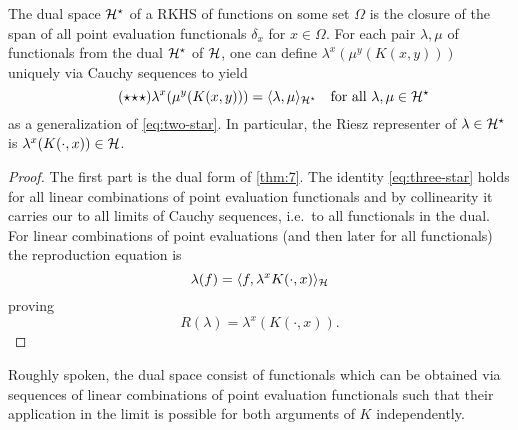 \documentclass[../lecture-notes.tex]{subfiles}
\begin{document}
\begin{theorem} %
\label{thm:10}
The dual space $\mathcal{H}^{\star}$ of a \ac{RKHS} of functions on some set $\Omega$ is the closure of the span of all point evaluation functionals $\delta_x$ for $x \in \Omega$.
For each pair $\lambda, \mu$ of functionals from the dual $\mathcal{H}^{\star}$ of $\mathcal{H}$, one can define $\lambda^x(\mu^y(K(x, y)))$ uniquely via Cauchy sequences to yield
\begin{equation}
\label{eq:three-star}
\opttag{$\star\!\star\!\star$}
	\lambda^x(\mu^y(K(x, y))) = \langle \lambda, \mu \rangle_{\spHstar} \quad \text{for all } \lambda, \mu \in \spHstar
\end{equation}
as a generalization of \cref{eq:two-star}.
In particular, the Riesz representer of $\lambda \in \mathcal{H}^{\star}$ is $\lambda^x(K(\cdot, x)) \in \mathcal{H}$.
\end{theorem}
\begin{proof}
The first part is the dual form of \cref{thm:7}.
The identity \cref{eq:three-star} holds for all linear combinations of point evaluation functionals and by collinearity it carries our to all limits of Cauchy sequences, i.e.\ to all functionals in the dual.
For linear combinations of point evaluations (and then later for all functionals) the reproduction equation is
\[
	\lambda(f) = \langle f, \lambda^x K(\cdot, x) \rangle_{\mathcal{H}}
\]
proving
\[
	R(\lambda) = \lambda^x(K(\cdot, x)).
\]
\end{proof}
Roughly spoken, the dual space consist of functionals which can be obtained via sequences of linear combinations of point evaluation functionals such that their application in the limit is possible for both arguments of $K$ independently.
\end{document}
